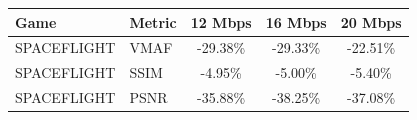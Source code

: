 \begin{tabular}{llccc}
\toprule
Game & Metric & 12 Mbps & 16 Mbps & 20 Mbps \\
\midrule
SPACEFLIGHT & VMAF & -29.38\% & -29.33\% & -22.51\% \\
SPACEFLIGHT & SSIM & -4.95\% & -5.00\% & -5.40\% \\
SPACEFLIGHT & PSNR & -35.88\% & -38.25\% & -37.08\% \\
\bottomrule
\end{tabular}

